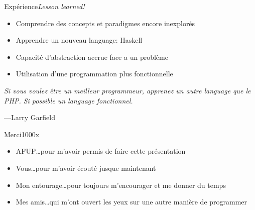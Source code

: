 \begin{frame}{Expérience}{\textit{Lesson learned!}}
    \begin{itemize}[<+->]
        \item Comprendre des concepts et paradigmes encore inexplorés
        \item Apprendre un nouveau language: Haskell
        \item Capacité d'abstraction accrue face a un problème
        \item Utilisation d'une programmation plus fonctionnelle
    \end{itemize}
\end{frame}


\begin{frame}
    \begin{flushleft}
        \textit{
            Si vous voulez être un meilleur programmeur, apprenez un autre language que
            le PHP. Si possible un language fonctionnel.
        }
        \begin{flushright}
            \tiny{---Larry Garfield}
        \end{flushright}
    \end{flushleft}

\end{frame}

\begin{frame}{Merci}{1000x}
    \begin{itemize}[<+->]
        \item AFUP\ldots pour m'avoir permis de faire cette présentation
        \item Vous\ldots pour m'avoir écouté jusque maintenant
        \item Mon entourage\ldots pour toujours m'encourager et me donner du temps
        \item Mes amis\ldots qui m'ont ouvert les yeux sur une autre manière de programmer
    \end{itemize}
\end{frame}
